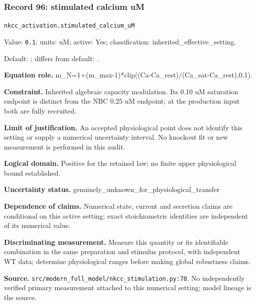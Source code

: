\subsubsection*{Record 96: stimulated calcium uM}
{\small \nolinkurl{nkcc_activation.stimulated_calcium_uM}\par

Value: \texttt{0.1}; units: uM; active: Yes; classification: inherited\_effective\_setting.\par

Default: ; differs from default: .\par

\textbf{Equation role.} m\_N=1+(m\_max-1)*clip((Ca-Ca\_rest)/(Ca\_sat-Ca\_rest),0,1).\par

\textbf{Constraint.} Inherited algebraic capacity modulation. Its 0.10 uM saturation endpoint is distinct from the NBC 0.25 uM endpoint; at the production input both are fully recruited.\par

\textbf{Limit of justification.} An accepted physiological point does not identify this setting or supply a numerical uncertainty interval. No knockout fit or new measurement is performed in this audit.\par

\textbf{Logical domain.} Positive for the retained law; no finite upper physiological bound established.\par

\textbf{Uncertainty status.} genuinely\_unknown\_for\_physiological\_transfer\par

\textbf{Dependence of claims.} Numerical state, current and secretion claims are conditional on this active setting; exact stoichiometric identities are independent of its numerical value.\par

\textbf{Discriminating measurement.} Measure this quantity or its identifiable combination in the same preparation and stimulus protocol, with independent WT data; determine physiological ranges before making global robustness claims.\par

\textbf{Source.} \nolinkurl{src/modern_full_model/nkcc_stimulation.py:78}. No independently verified primary measurement attached to this numerical setting; model lineage is the source.\par}

